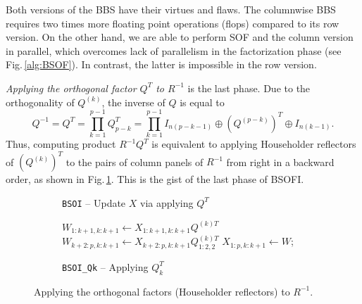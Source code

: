 \documentclass{llncs}
\begin{document}
Both versions of the BBS have their virtues and flaws. 
The columnwise BBS requires 
two times more floating point operations (flops) compared to 
its row version.  On the other hand, 
we are able to perform SOF and the column version in parallel, 
which overcomes lack of parallelism 
in the factorization phase (see Fig.\,\ref{alg:BSOF}).
In contrast, the latter is impossible in the row version.

\textit{Applying the orthogonal factor $Q^T$ to $R^{-1}$} 
is the last phase.
Due to the orthogonality of $Q^{(k)}$, the inverse of $Q$ is equal to 
\begin{equation}
  Q^{-1} = Q^{T} = \prod_{k=1}^{p-1} Q_{p-k}^{T} = 
  \prod_{k=1}^{p-1} I_{n(p-k-1)}\oplus \left(Q^{(p-k)}\right)^{T} \oplus 
  I_{n(k-1)}.
\end{equation}
Thus, computing product $R^{-1} Q^{T}$ is equivalent to
applying Householder reflectors of $\left(Q^{(k)}\right)^{T}$ to 
the pairs of column panels of $R^{-1}$ from right in a backward order, 
as shown in Fig.\,\ref{alg:BSOI_Cycle}. 
This is the gist of the last phase of BSOFI.
\begin{figure}[t]%
  \centering
  \begin{subfigure}[t]{0.49\linewidth}
    \begin{algorithm}[H]
      \BlankLine

      \BlankLine
    \end{algorithm}    
    \caption{{\tt BSOI} -- Update $X$ via applying $Q^{T}$
      \label{alg:BSOI_Cycle}}
  \end{subfigure}
  \hfill
  \begin{subfigure}[t]{0.5\linewidth}
    \begin{algorithm}[H]

      $W_{1:k+1,k:k+1} \gets X_{1:k+1,k:k+1} Q^{(k)T} $\;
      $W_{k+2:p,k:k+1} \gets X_{k+2:p,k:k+1} Q_{1:2,2}^{(k)T}$\;
      $X_{1:p,k:k+1} \gets W$;
    \end{algorithm}    
    \caption{{\tt BSOI\_Qk} -- Applying $Q_k^{T}$
      \label{alg:BSOI_Qk}}
  \end{subfigure}
  \caption{Applying the orthogonal factors (Householder reflectors) to $R^{-1}$.
    \label{alg:BSOI}}
\end{figure}
\end{document}
